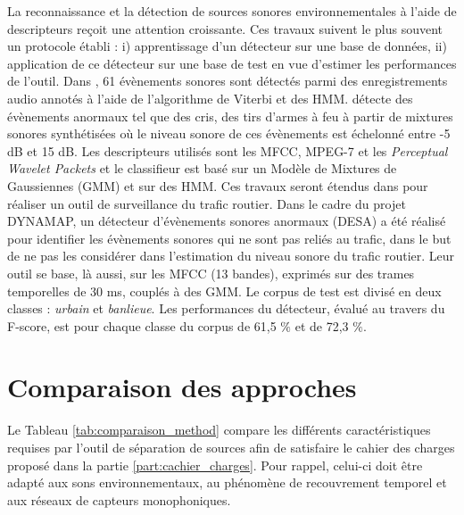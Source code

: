 La reconnaissance et la détection de sources sonores environnementales à l'aide de descripteurs \cite{dufaux2000automatic,defreville_automatic_2006} reçoit une attention croissante. Ces travaux suivent le plus souvent un protocole établi : i) apprentissage d'un détecteur sur une base de données, ii) application de ce détecteur sur une base de test en vue d'estimer les performances de l'outil. Dans \cite{mesaros2010acoustic}, 61 évènements sonores sont détectés parmi des enregistrements audio annotés à l'aide de l'algorithme de Viterbi et des HMM. \cite{ntalampiras2011probabilistic} détecte des évènements anormaux tel que des cris, des tirs d'armes à feu à partir de mixtures sonores synthétisées où le niveau sonore de ces évènements est échelonné entre -5 dB et 15 dB. Les descripteurs utilisés sont les MFCC, MPEG-7 et les \textit{Perceptual Wavelet Packets} et le classifieur est basé sur un Modèle de Mixtures de Gaussiennes (GMM) et sur des HMM. Ces travaux seront étendus dans \cite{ntalampiras2014universal} pour réaliser un outil de surveillance du trafic routier. Dans le cadre du projet DYNAMAP, un détecteur d'évènements sonores anormaux (DESA) a été réalisé \cite{socoro2017anomalous} pour identifier les évènements sonores qui ne sont pas reliés au trafic, dans le but de ne pas les considérer dans l'estimation du niveau sonore du trafic routier. Leur outil se base, là aussi, sur les MFCC (13 bandes), exprimés sur des trames temporelles de 30 ms, couplés à des GMM. Le corpus de test est divisé en deux classes : \textit{urbain} et \textit{banlieue}. Les performances du détecteur, évalué au travers du F-score, est pour chaque classe du corpus de 61,5 $\%$ et de 72,3 $\%$.

\section{Comparaison des approches}

Le Tableau \ref{tab:comparaison_method} compare les différents caractéristiques requises par l'outil de séparation de sources afin de satisfaire le cahier des charges proposé dans la partie \ref{part:cachier_charges}. Pour rappel, celui-ci doit être adapté aux sons environnementaux, au phénomène de recouvrement temporel et aux réseaux de capteurs monophoniques.

